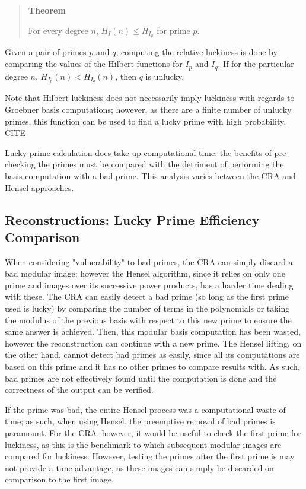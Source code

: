 \documentclass[letterpaper,12pt,titlepage,oneside,final]{book}
\newcounter{theoremcounter}
\newenvironment{theorem}{\begin{quote}%
    \refstepcounter{theoremcounter}%
  \textbf{Theorem \arabic{theoremcounter}}%
  \quad
}{%
\end{quote}%
}
\begin{document}
\begin{theorem}
  For every degree ${n}$, ${H_I(n) \leq H_{I_p}}$ for prime ${p}$.
\end{theorem}

Given a pair of primes ${p}$ and ${q}$, computing the relative luckiness is done by comparing the values of the Hilbert functions for ${I_p}$ and ${I_q}$.  If for the particular degree ${n}$, ${H_{I_p}(n) < H_{I_q}(n)}$, then ${q}$ is unlucky.  

Note that Hilbert luckiness does not necessarily imply luckiness with regards to Groebner basis computations; however, as there are a finite number of unlucky primes, this function can be used to find a lucky prime with high probability.  CITE   

Lucky prime calculation does take up computational time; the benefits of pre-checking the primes must be compared with the detriment of performing the basis computation with a bad prime.  This analysis varies between the CRA and Hensel approaches. 

\subsection{Reconstructions: Lucky Prime Efficiency Comparison}

When considering "vulnerability" to bad primes, the CRA can simply discard a bad modular image; however the Hensel algorithm, since it relies on only one prime and images over its successive power products, has a harder time dealing with these.  The CRA can easily detect a bad prime (so long as the first prime used is lucky) by comparing the number of terms in the polynomials or taking the modulus of the previous basis with respect to this new prime to ensure the same answer is achieved.  Then, this modular basis computation has been wasted, however the reconstruction can continue with a new prime.  The Hensel lifting, on the other hand, cannot detect bad primes as easily, since all its computations are based on this prime and it has no other primes to compare results with.  As such, bad primes are not effectively found until the computation is done and the correctness of the output can be verified.  

If the prime was bad, the entire Hensel process was a computational waste of time; as such, when using Hensel, the preemptive removal of bad primes is paramount.  For the CRA, however, it would be useful to check the first prime for luckiness, as this is the benchmark to which subsequent modular images are compared for luckiness.  However, testing the primes after the first prime is may not provide a time advantage, as these images can simply be discarded on comparison to the first image.
\end{document}
